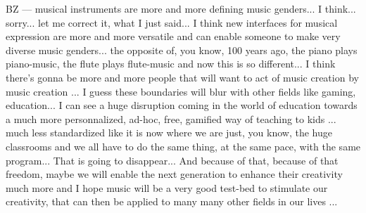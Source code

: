 BZ — musical instruments are more and more defining music genders... I think... sorry... let me correct it, what I just said... I think new interfaces for musical expression are more and more versatile and can enable someone to make very diverse music genders... the opposite of, you know, 100 years ago, the piano plays piano-music, the flute plays flute-music and now this is so different... I think there's gonna be more and more people that will want to act of music creation by music creation ... I guess these boundaries will blur with other fields like gaming, education... I can see a huge disruption coming in the world of education towards a much more personnalized, ad-hoc, free, gamified way of teaching to kids ... much less standardized like it is now where we are just, you know, the huge classrooms and we all have to do the same thing, at the same pace, with the same program... That is going to disappear... And because of that, because of that freedom, maybe we will enable the next generation to enhance their creativity much more and I hope music will be a very good test-bed to stimulate our creativity, that can then be applied to many many other fields in our lives ...